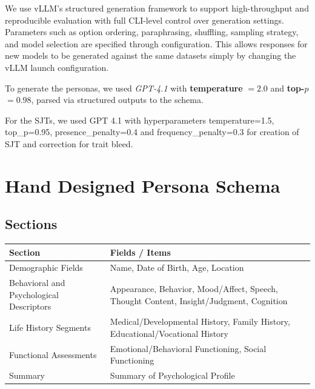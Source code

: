 \documentclass[11pt]{article}
\begin{document}
We use vLLM’s structured generation framework \cite{kwon2023efficient} to support high-throughput and reproducible evaluation with full CLI-level control over generation settings. Parameters such as option ordering, paraphrasing, shuffling, sampling strategy, and model selection are specified through configuration. This allows responses for new models to be generated against the same datasets simply by changing the vLLM launch configuration.

To generate the personas, we used \emph{GPT-4.1} \citep{openai2024gpt4technicalreport} with \textbf{temperature} $=2.0$ and \textbf{top-$p$} $=0.98$, parsed via structured outputs to the schema.

For the SJTs, we used GPT 4.1 with hyperparameters temperature=1.5, top\_p=0.95, presence\_penalty=0.4 and frequency\_penalty=0.3 for creation of SJT and correction for trait bleed.


\section{Hand Designed Persona Schema}
\label{app:persona_schema}
\subsection*{Sections}
{\small
\begin{tabular}{|p{7cm}|p{9cm}|}
\hline
\textbf{Section} & \textbf{Fields / Items} \\
\hline
Demographic Fields &
Name, Date of Birth, Age, Location \\
\hline
Behavioral and Psychological Descriptors &
Appearance, Behavior, Mood/Affect, Speech, Thought Content, Insight/Judgment, Cognition \\
\hline
Life History Segments &
Medical/Developmental History, Family History, Educational/Vocational History \\
\hline
Functional Assessments &
Emotional/Behavioral Functioning, Social Functioning \\
\hline
Summary & Summary of Psychological Profile \\
\hline
\end{tabular}
}
\end{document}
